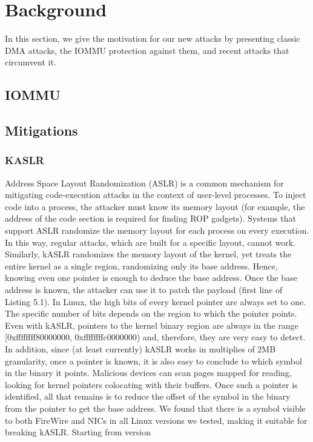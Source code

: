 \section{Background}
In this section, we give the motivation for our new attacks by presenting classic DMA attacks, the IOMMU protection against them, and recent attacks that circumvent it.
\subsection{IOMMU}
\subsection{Mitigations}
\subsubsection{KASLR}
Address Space Layout Randomization (ASLR) is a common mechanism for mitigating
code-execution attacks in the context of user-level processes. To inject code into a
process, the attacker must know its memory layout (for example, the address of the code
section is required for finding ROP gadgets). Systems that support ASLR randomize the
memory layout for each process on every execution. In this way, regular attacks, which
are built for a specific layout, cannot work. Similarly, kASLR randomizes the memory
layout of the kernel, yet treats the entire kernel as a single region, randomizing only its
base address. Hence, knowing even one pointer is enough to deduce the base address.
Once the base address is known, the attacker can use it to patch the payload (first line of Listing 5.1).
In Linux, the high bits of every kernel pointer are always set to one. The specific number of bits depends on the region to which the pointer points. Even with
kASLR, pointers to the kernel binary region are always in the range [0xffffffff80000000,
0xffffffffc0000000) and, therefore, they are very easy to detect. In addition, since (at
least currently) kASLR works in multiplies of 2MB granularity, once a pointer is known,
it is also easy to conclude to which symbol in the binary it points. Malicious devices
can scan pages mapped for reading, looking for kernel pointers colocating with their
buffers. Once such a pointer is identified, all that remains is to reduce the offset of the
symbol in the binary from the pointer to get the base address.
We found that there is a symbol visible to both FireWire and NICs in all Linux
versions we tested, making it suitable for breaking kASLR. Starting from version
